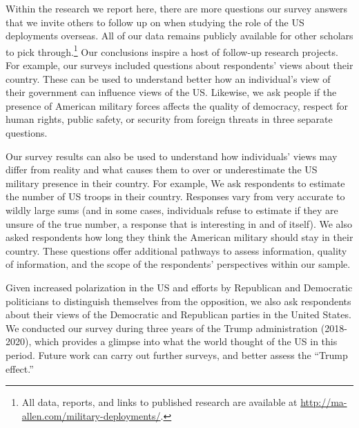Within the research we report here, there are more questions our survey answers that we invite others to follow up on when studying the role of the US deployments overseas. All of our data remains publicly available for other scholars to pick through.\footnote{All data, reports, and links to published research are available at \url{http://ma-allen.com/military-deployments/}.} Our conclusions inspire a host of follow-up research projects. For example, our surveys included questions about respondents' views about their country. These can be used to understand better how an individual's view of their government can influence views of the US. Likewise, we ask people if the presence of American military forces affects the quality of democracy, respect for human rights, public safety, or security from foreign threats in three separate questions. 

Our survey results can also be used to understand how individuals' views may differ from reality and what causes them to over or underestimate the US military presence in their country. For example, We ask respondents to estimate the number of US troops in their country. Responses vary from very accurate to wildly large sums (and in some cases, individuals refuse to estimate if they are unsure of the true number, a response that is interesting in and of itself). We also asked respondents how long they think the American military should stay in their country. These questions offer additional pathways to assess information, quality of information, and the scope of the respondents' perspectives within our sample. 

Given increased polarization in the US and efforts by Republican and Democratic politicians to distinguish themselves from the opposition, we also ask respondents about their views of the Democratic and Republican parties in the United States. We conducted our survey during three years of the Trump administration (2018-2020), which provides a glimpse into what the world thought of the US in this period. Future work can carry out further surveys, and better assess the ``Trump effect.''

